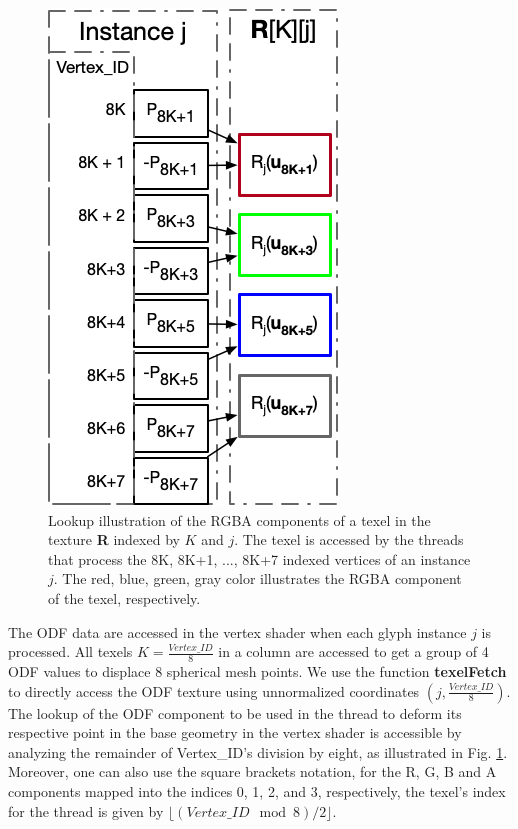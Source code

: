 \documentclass[twoside,twocolumn,10pt]{article}
\begin{document}
\begin{figure}[ht]
    \centering
    \includegraphics[width=0.7\linewidth, angle=0]{figs/rendering_scheme/texellookup.png}
    \caption{Lookup illustration of the RGBA components of a texel in the texture \textbf{R} indexed by $K$ and $j$. The texel is accessed by the threads that process the 8K, 8K+1, ..., 8K+7 indexed vertices of an instance $j$. The red, blue, green, gray color illustrates the RGBA component of the texel, respectively.}
    \label{fig::texelfetch}
\end{figure}

 
 The ODF data are accessed in the vertex shader when each glyph instance $j$ is processed. All texels $K = \frac{Vertex\_ID}{8}$ in a column are accessed to get a group of 4 ODF values to displace 8 spherical mesh points. We use the function {\bf texelFetch} to directly access the ODF texture using unnormalized coordinates $(j, \frac{Vertex\_ID}{8})$. The lookup of the ODF component to be used in the thread to deform its respective point in the base geometry in the vertex shader is accessible by analyzing the remainder of Vertex\_ID's division by eight, as illustrated in Fig. \ref{fig::texelfetch}. Moreover, one can also use the square brackets notation, for the R, G, B and A components mapped into the indices 0, 1, 2, and 3, respectively, the texel's index for the thread is given by $\lfloor (Vertex\_ID \mod{8})/2 \rfloor$.
\end{document}
